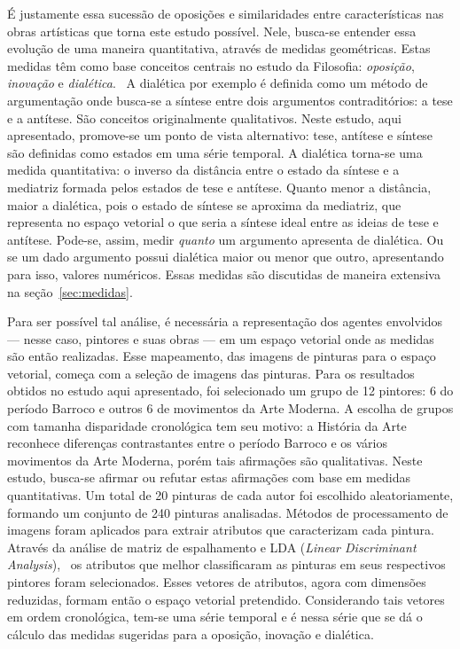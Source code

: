 É justamente essa sucessão de oposições e similaridades entre
características nas obras artísticas que torna este estudo
possível. Nele, busca-se entender essa evolução de uma maneira
quantitativa, através de medidas geométricas. Estas medidas têm como
base conceitos centrais no estudo da Filosofia: \textit{oposição},
\textit{inovação} e \textit{dialética}.~\cite{deleuze,pinto,van} A
dialética por exemplo é definida como um método de argumentação onde
busca-se a síntese entre dois argumentos contraditórios: a tese e a
antítese. São conceitos originalmente qualitativos. Neste estudo, aqui
apresentado, promove-se um ponto de vista alternativo: tese, antítese
e síntese são definidas como estados em uma série temporal. A
dialética torna-se uma medida quantitativa: o inverso da distância
entre o estado da síntese e a mediatriz formada pelos estados de tese
e antítese. Quanto menor a distância, maior a dialética, pois o estado
de síntese se aproxima da mediatriz, que representa no espaço vetorial
o que seria a síntese ideal entre as ideias de tese e
antítese. Pode-se, assim, medir
\emph{quanto} um argumento apresenta de dialética. Ou se um dado
argumento possui dialética maior ou menor que outro, apresentando para
isso, valores numéricos. Essas medidas são discutidas de maneira
extensiva na seção~\ref{sec:medidas}.

Para ser possível tal análise, é necessária a representação dos
agentes envolvidos --- nesse caso, pintores e suas obras --- em um
espaço vetorial onde as medidas são então realizadas. Esse mapeamento,
das imagens de pinturas para o espaço vetorial, começa com a seleção
de imagens das pinturas. Para os resultados obtidos no estudo aqui
apresentado, foi selecionado um grupo de 12 pintores: 6 do período
Barroco e outros 6 de movimentos da Arte Moderna. A escolha de grupos
com tamanha disparidade cronológica tem seu motivo: a História da Arte
reconhece diferenças contrastantes entre o período Barroco e os vários
movimentos da Arte Moderna, porém tais afirmações são
qualitativas. Neste estudo, busca-se afirmar ou refutar estas
afirmações com base em medidas quantitativas. Um total de 20 pinturas
de cada autor foi escolhido aleatoriamente, formando um conjunto de
240 pinturas analisadas. Métodos de processamento de imagens foram
aplicados para extrair atributos que caracterizam cada
pintura. Através da análise de matriz de espalhamento e LDA
(\textit{Linear Discriminant Analysis}),~\cite{luciano,fisher} os
atributos que melhor classificaram as pinturas em seus respectivos
pintores foram selecionados. Esses vetores de atributos, agora com
dimensões reduzidas, formam então o espaço vetorial
pretendido. Considerando tais vetores em ordem cronológica, tem-se uma
série temporal e é nessa série que se dá o cálculo das medidas
sugeridas para a oposição, inovação e dialética.

